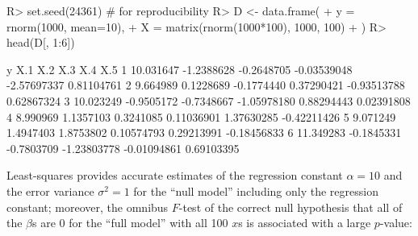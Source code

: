 \documentclass[
]{jss}
\begin{document}
\begin{CodeChunk}
\begin{CodeInput}
R> set.seed(24361) # for reproducibility
R> D <- data.frame(
+   y = rnorm(1000, mean=10),
+   X = matrix(rnorm(1000*100), 1000, 100)
+ )
R> head(D[, 1:6])
\end{CodeInput}
\begin{CodeOutput}
          y        X.1        X.2         X.3         X.4         X.5
1 10.031647 -1.2388628 -0.2648705 -0.03539048 -2.57697337  0.81104761
2  9.664989  0.1228689 -0.1774440  0.37290421 -0.93513788  0.62867324
3 10.023249 -0.9505172 -0.7348667 -1.05978180  0.88294443  0.02391808
4  8.990969  1.1357103  0.3241085  0.11036901  1.37630285 -0.42211426
5  9.071249  1.4947403  1.8753802  0.10574793  0.29213991 -0.18456833
6 11.349283 -0.1845331 -0.7803709 -1.23803778 -0.01094861  0.69103395
\end{CodeOutput}
\end{CodeChunk}

Least-squares provides accurate estimates of the regression constant
\(\alpha = 10\) and the error variance \(\sigma^2 = 1\) for the ``null
model'' including only the regression constant; moreover, the omnibus
\(F\)-test of the correct null hypothesis that all of the \(\beta\)s are
0 for the ``full model'' with all 100 \(x\)s is associated with a large
\(p\)-value:
\end{document}
